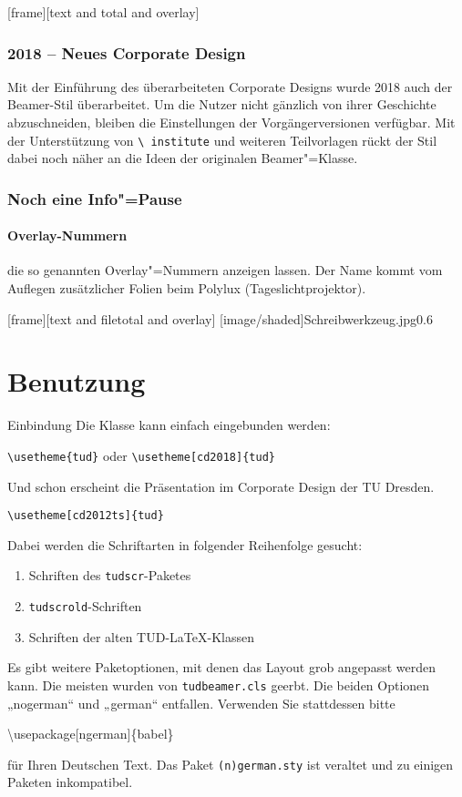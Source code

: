 [frame][text and total and overlay]
\begin{frame}
  \frametitle{2018 – Neues Corporate Design} Mit der Einführung des
  überarbeiteten Corporate Designs wurde 2018 auch der Beamer-Stil
  überarbeitet. Um die Nutzer nicht gänzlich von ihrer Geschichte
  abzuschneiden, bleiben die Einstellungen der Vorgängerversionen
  verfügbar. Mit der Unterstützung von \texttt{\textbackslash
    institute} und weiteren Teilvorlagen rückt der Stil dabei noch
  näher an die Ideen der originalen Beamer"=Klasse.
\end{frame}
\begin{frame}\frametitle{Noch eine Info"=Pause}
  \framesubtitle{Overlay-Nummern}

  die so genannten \alert<6>{Overlay}"=Nummern anzeigen lassen. Der
  Name kommt vom Auflegen zusätzlicher Folien beim Polylux
  (Tageslichtprojektor).
\end{frame}

[frame][text and filetotal and overlay]
[image/shaded]{Schreibwerkzeug.jpg}{0.6}
\section{Benutzung}

\begin{frame}[allowframebreaks]{Einbindung}
  Die Klasse kann einfach eingebunden werden:
  \begin{block}{}
    \texttt{\textbackslash usetheme\{tud\}} oder
    \texttt{\textbackslash usetheme[cd2018]\{tud\}}
  \end{block}
  Und schon erscheint die Präsentation im Corporate Design der TU Dresden.

  \begin{block}{}
    \texttt{\textbackslash usetheme[cd2012ts]\{tud\}}
  \end{block}
  Dabei werden die Schriftarten in folgender Reihenfolge gesucht:
  \begin{enumerate}
  \item Schriften des \texttt{tudscr}-Paketes
  \item<+-> \texttt{tudscrold}-Schriften
  \item<+-> Schriften der alten TUD-\LaTeX-Klassen
  \end{enumerate}
  \framebreak
  Es gibt weitere Paketoptionen, mit denen das Layout grob angepasst
  werden kann.  Die meisten wurden von \texttt{tudbeamer.cls}
  geerbt. Die beiden Optionen „nogerman“ und „german“
  entfallen. Verwenden Sie stattdessen bitte
  \begin{block}{}
    \textbackslash usepackage[ngerman]\{babel\}
  \end{block}
  für Ihren Deutschen Text. Das Paket \texttt{(n)german.sty} ist
  veraltet und zu einigen Paketen inkompatibel.
\end{frame}

